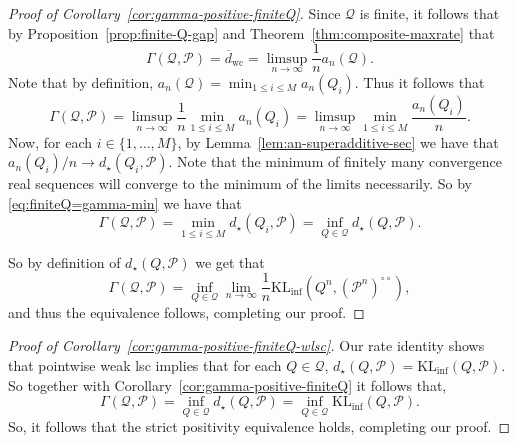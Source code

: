 \documentclass[11pt]{article}
\newcommand{\KLinf}{\mathrm{KL}_{\mathrm{inf}}}
\newcommand{\Pcal}{\mathcal{P}}
\newcommand{\Qcal}{\mathcal{Q}}
\theoremstyle{definition}
\theoremstyle{definition}
\begin{document}
\begin{proof}[Proof of Corollary~\ref{cor:gamma-positive-finiteQ}]
Since $\Qcal$ is finite, it follows that by Proposition~\ref{prop:finite-Q-gap} and Theorem~\ref{thm:composite-maxrate} that
\[
\Gamma(\Qcal,\Pcal)=\overline d_{\mathrm{wc}}=\limsup_{n\to\infty}\frac1n a_n(\Qcal).
\]
Note that by definition, $a_n(\Qcal)=\min_{1\le i\le M}a_n(Q_i)$. Thus it follows that
\begin{equation}\label{eq:finiteQ=gamma-min}
\Gamma(\Qcal,\Pcal)=\limsup_{n\to\infty}\frac1n \min_{1\le i\le M} a_n(Q_i)=\limsup_{n\to\infty}\min_{1\le i\le M} \frac{a_n(Q_i)}{n}.   
\end{equation}
Now, for each $i\in\{1,\dots,M\}$, by Lemma~\ref{lem:an-superadditive-sec} we have that $a_n(Q_i)/n \to d_{\star}(Q_i,\Pcal)$. Note that the minimum of finitely many convergence real sequences will converge to the minimum of the limits necessarily. So by \eqref{eq:finiteQ=gamma-min} we have that
\begin{equation}\label{eq:infKL-equiv}
\Gamma(\Qcal,\Pcal)=\min_{1\le i\le M} d_{\star}(Q_i,\Pcal)=\inf_{Q\in\Qcal}d_{\star}(Q,\Pcal).    
\end{equation}

So by definition of $d_{\star}(Q,\Pcal)$ we get that
\[
\Gamma(\Qcal,\Pcal)=\inf_{Q\in\Qcal}\lim_{n\to\infty}\frac1n \KLinf(Q^n,(\Pcal^n)^{\circ\circ}),
\]
and thus the equivalence follows, completing our proof.
\end{proof}

\begin{proof}[Proof of Corollary~\ref{cor:gamma-positive-finiteQ-wlsc}]
Our rate identity shows that pointwise weak lsc implies that for each $Q\in\Qcal$, $d_{\star}(Q,\Pcal)=\KLinf(Q,\Pcal)$. So together with Corollary~\ref{cor:gamma-positive-finiteQ} it follows that,
\[
\Gamma(\Qcal,\Pcal)=\inf_{Q\in\Qcal}d_{\star}(Q,\Pcal)=\inf_{Q\in\Qcal}\KLinf(Q,\Pcal).
\]
So, it follows that the strict positivity equivalence holds, completing our proof.
\end{proof}
\end{document}
